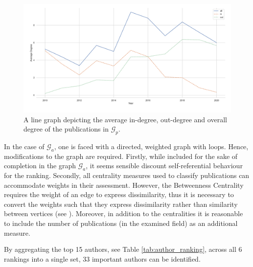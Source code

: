 \documentclass[11pt,a4paper]{book}
\theoremstyle{definition}
\theoremstyle{definition}
\theoremstyle{definition}
\theoremstyle{remark}
\newcommand{\pgraph}{\mathcal{G}_{p}}
\newcommand{\agraph}{\mathcal{G}_{a}}
\begin{document}
\begin{figure}[h]
\includegraphics[width=\textwidth]{average_degree_year.png}
\caption{A line graph depicting the average in-degree, out-degree and overall degree of the publications in $\pgraph$.}
\label{fig:pgraph-avgr_degree_year}
\end{figure}


In the case of $\agraph$, one is faced with a directed, weighted graph with loops. Hence, modifications to the graph are required. Firstly, while included for the sake of completion in the graph $\agraph$, it seems sensible discount self-referential behaviour for the ranking. Secondly, all centrality measures used to classify publications
can accommodate weights in their assessment. However, the Betweenness Centrality requires the weight of an edge to express dissimilarity, thus it is necessary to convert the weights such that they express dissimilarity rather than similarity between vertices (see \cite[p.~13]{runkler2012data}). Moreover, in addition to the centralities it is reasonable to include the number of publications (in the examined field) as an additional measure. 



By aggregating the top 15 authors, see Table \ref{tab:author_ranking}, across all 6 rankings into a single set, $33$ important authors can be identified. 
\end{document}
